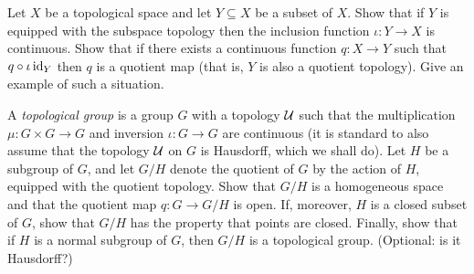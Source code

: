 \begin{exercise}
  Let \(X\) be a topological space and let \(Y\subseteq X\) be a subset of
  \(X\). Show that if \(Y\) is equipped with the subspace topology then the
  inclusion function \(\iota\colon Y\to X\) is continuous. Show that if
  there exists a continuous function \(q\colon X\to Y\) such that
  \(q\circ\iota\operatorname{id}_Y\) then \(q\) is a quotient map (that is, \(Y\) is also
  a quotient topology). Give an example of such a situation.
\end{exercise}
\begin{solution}
\end{solution}

\begin{exercise}
  A \emph{topological group} is a group \(G\) with a topology \(\mathcal{U}\)
  such that the multiplication \(\mu\colon G\times G\to G\) and inversion
  \(\iota\colon G\to G\) are continuous (it is standard to also assume that
  the topology \(\mathcal{U}\) on \(G\) is Hausdorff, which we shall do). Let
  \(H\) be a subgroup of \(G\), and let \(G/H\) denote the quotient of
  \(G\) by the action of \(H\), equipped with the quotient topology. Show
  that \(G/H\) is a homogeneous space and that the quotient map \(q\colon
  G\to G/H\) is open. If, moreover, \(H\) is a closed subset of \(G\), show
  that \(G/H\) has the property that points are closed. Finally, show that
  if \(H\) is a normal subgroup of \(G\), then \(G/H\) is a topological
  group. (Optional: is it Hausdorff?)
\end{exercise}
\begin{solution}
\end{solution}


